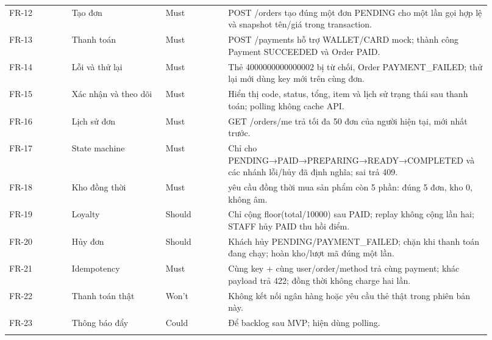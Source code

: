 \documentclass[a4paper,12pt,oneside]{report}
\begin{document}
\begin{longtable}{@{}>{\raggedright\arraybackslash}p{0.12\linewidth} >{\raggedright\arraybackslash}p{0.18\linewidth} >{\raggedright\arraybackslash}p{0.12\linewidth} >{\raggedright\arraybackslash}p{0.5\linewidth}@{}}
\addlinespace[2pt]
FR-12 & Tạo đơn & Must & POST /\allowbreak{}orders tạo đúng một đơn PENDING cho một lần gọi hợp lệ và snapshot tên/\allowbreak{}giá trong transaction. \\
\addlinespace[2pt]
FR-13 & Thanh toán & Must & POST /\allowbreak{}payments hỗ trợ WALLET/\allowbreak{}CARD mock; thành công Payment SUCCEEDED và Order PAID. \\
\addlinespace[2pt]
FR-14 & Lỗi và thử lại & Must & Thẻ 4000000000000002 bị từ chối, Order PAYMENT\_FAILED; thử lại mới dùng key mới trên cùng đơn. \\
\addlinespace[2pt]
FR-15 & Xác nhận và theo dõi & Must & Hiển thị code, status, tổng, item và lịch sử trạng thái sau thanh toán; polling không cache API. \\
\addlinespace[2pt]
FR-16 & Lịch sử đơn & Must & GET /\allowbreak{}orders/\allowbreak{}me trả tối đa 50 đơn của người hiện tại, mới nhất trước. \\
\addlinespace[2pt]
FR-17 & State machine & Must & Chỉ cho PENDING→PAID→PREPARING→READY→COMPLETED và các nhánh lỗi/\allowbreak{}hủy đã định nghĩa; sai trả 409. \\
\addlinespace[2pt]
FR-18 & Kho đồng thời & Must & 20 yêu cầu đồng thời mua sản phẩm còn 5 phần: đúng 5 đơn, kho 0, không âm. \\
\addlinespace[2pt]
FR-19 & Loyalty & Should & Chỉ cộng floor(total/\allowbreak{}10000) sau PAID; replay không cộng lần hai; STAFF hủy PAID thu hồi điểm. \\
\addlinespace[2pt]
FR-20 & Hủy đơn & Should & Khách hủy PENDING/\allowbreak{}PAYMENT\_FAILED; chặn khi thanh toán đang chạy; hoàn kho/\allowbreak{}lượt mã đúng một lần. \\
\addlinespace[2pt]
FR-21 & Idempotency & Must & Cùng key + cùng user/\allowbreak{}order/\allowbreak{}method trả cùng payment; khác payload trả 422; đồng thời không charge hai lần. \\
\addlinespace[2pt]
FR-22 & Thanh toán thật & Won’t & Không kết nối ngân hàng hoặc yêu cầu thẻ thật trong phiên bản này. \\
\addlinespace[2pt]
FR-23 & Thông báo đẩy & Could & Để backlog sau MVP; hiện dùng polling. \\
\addlinespace[2pt]
\bottomrule\end{longtable}\endgroup
\end{document}
